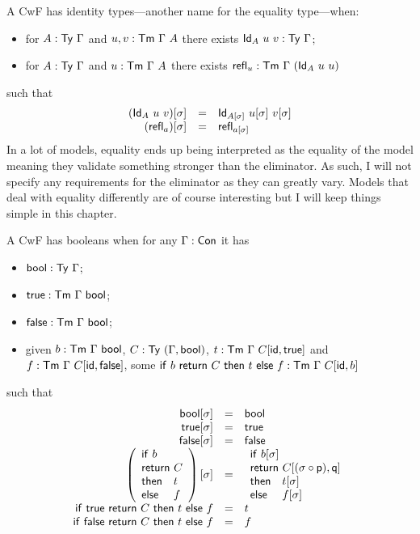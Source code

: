 
A \acrshort{CwF} has identity types---another name for the equality type---when:
\begin{itemize}
  \item for \(A : \mathsf{Ty}\ \Gamma\) and \(u, v : \mathsf{Tm}\ \Gamma\ A\) there exists
  \(\mathsf{Id}_A\ u\ v : \mathsf{Ty}\ \Gamma\);
  \item for \(A : \mathsf{Ty}\ \Gamma\) and \(u : \mathsf{Tm}\ \Gamma\ A\) there exists
  \(\crefl_u : \CTm\ \Ga\ (\CId_A\ u\ u)\)
\end{itemize}
such that
\[
  \begin{array}{rcl}
    (\CId_A\ u\ v)[\sigma] &=& \CId_{A[\sigma]}\ u[\sigma]\ v[\sigma] \\
    (\crefl_a)[\sigma] &=& \crefl_{a[\sigma]}
  \end{array}
\]
In a lot of models, equality ends up being interpreted as the equality of the
model meaning they validate something stronger than the eliminator. As such,
I will not specify any requirements for the eliminator as they can greatly vary.
Models that deal with equality differently are of course interesting but I
will keep things simple in this chapter.


A \acrshort{CwF} has booleans when for any \(\Gamma : \mathsf{Con}\) it has
\begin{itemize}
  \item \(\mathsf{bool} : \mathsf{Ty}\ \Gamma\);
  \item \(\ttrue : \CTm\ \Ga\ \bool\);
  \item \(\ffalse : \CTm\ \Ga\ \bool\);
  \item given \(b : \mathsf{Tm}\ \Gamma\ \mathsf{bool}\), \(C : \mathsf{Ty}\ (\Gamma, \mathsf{bool})\),
  \(t : \mathsf{Tm}\ \Gamma\ C[\mathsf{id}, \mathsf{true}]\) and \(f : \mathsf{Tm}\ \Gamma\ C[\mathsf{id}, \mathsf{false}]\),
  some \(\mathsf{if}\ b\ \mathsf{return}\ C\ \mathsf{then}\ t\ \mathsf{else}\ f : \mathsf{Tm}\ \Gamma\ C[\mathsf{id}, b]\)
\end{itemize}
such that
\[
  \begin{array}{rcl}
    \bool[\sigma] &=& \bool \\
    \ttrue[\sigma] &=& \ttrue \\
    \ffalse[\sigma] &=& \ffalse \\
    \left(\fitif{b}{C}{t}{f}\right)[\sigma] &=&
    \fitif{b[\sigma]}{C[(\sigma \circ \pp), \pq]}{t[\sigma]}{f[\sigma]} \\
    \tif{\ttrue}{C}{t}{f} &=& t \\
    \tif{\ffalse}{C}{t}{f} &=& f
  \end{array}
\]


